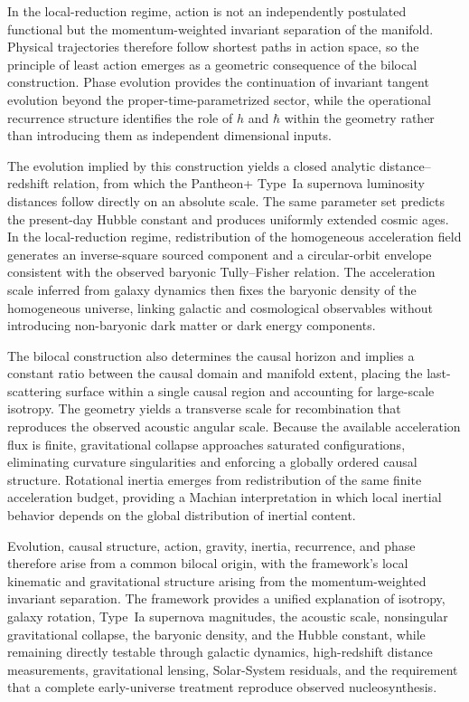 \documentclass[fontsize=12pt, paper=a4]{scrartcl}
\begin{document}
In the local-reduction regime, action is not an independently postulated functional but the momentum-weighted invariant separation of the manifold. Physical trajectories therefore follow shortest paths in action space, so the principle of least action emerges as a geometric consequence of the bilocal construction. Phase evolution provides the continuation of invariant tangent evolution beyond the proper-time-parametrized sector, while the operational recurrence structure identifies the role of $h$ and $\hbar$ within the geometry rather than introducing them as independent dimensional inputs.

The evolution implied by this construction yields a closed analytic distance--redshift relation, from which the Pantheon+ Type~Ia supernova luminosity distances follow directly on an absolute scale. The same parameter set predicts the present-day Hubble constant and produces uniformly extended cosmic ages. In the local-reduction regime, redistribution of the homogeneous acceleration field generates an inverse-square sourced component and a circular-orbit envelope consistent with the observed baryonic Tully--Fisher relation. The acceleration scale inferred from galaxy dynamics then fixes the baryonic density of the homogeneous universe, linking galactic and cosmological observables without introducing non-baryonic dark matter or dark energy components.

The bilocal construction also determines the causal horizon and implies a constant ratio between the causal domain and manifold extent, placing the last-scattering surface within a single causal region and accounting for large-scale isotropy. The geometry yields a transverse scale for recombination that reproduces the observed acoustic angular scale. Because the available acceleration flux is finite, gravitational collapse approaches saturated configurations, eliminating curvature singularities and enforcing a globally ordered causal structure. Rotational inertia emerges from redistribution of the same finite acceleration budget, providing a Machian interpretation in which local inertial behavior depends on the global distribution of inertial content.

Evolution, causal structure, action, gravity, inertia, recurrence, and phase therefore arise from a common bilocal origin, with the framework's local kinematic and gravitational structure arising from the momentum-weighted invariant separation. The framework provides a unified explanation of isotropy, galaxy rotation, Type~Ia supernova magnitudes, the acoustic scale, nonsingular gravitational collapse, the baryonic density, and the Hubble constant, while remaining directly testable through galactic dynamics, high-redshift distance measurements, gravitational lensing, Solar-System residuals, and the requirement that a complete early-universe treatment reproduce observed nucleosynthesis.



\end{document}

